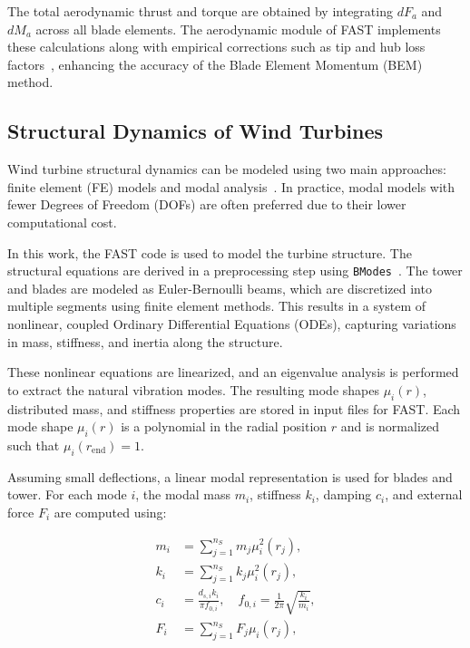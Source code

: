 The total aerodynamic thrust and torque are obtained by integrating $dF_a$ and $dM_a$ across all blade elements. The aerodynamic module of FAST implements these calculations along with empirical corrections such as tip and hub loss factors~\cite{fastV3}, enhancing the accuracy of the Blade Element Momentum (BEM) method.
         
\subsection{Structural Dynamics of Wind Turbines}

Wind turbine structural dynamics can be modeled using two main approaches: finite element (FE) models and modal analysis~\cite{bossanyi2010}. In practice, modal models with fewer Degrees of Freedom (DOFs) are often preferred due to their lower computational cost.

In this work, the FAST code is used to model the turbine structure. The structural equations are derived in a preprocessing step using \texttt{BModes}~\cite{bir2009}. The tower and blades are modeled as Euler-Bernoulli beams, which are discretized into multiple segments using finite element methods. This results in a system of nonlinear, coupled Ordinary Differential Equations (ODEs), capturing variations in mass, stiffness, and inertia along the structure.

These nonlinear equations are linearized, and an eigenvalue analysis is performed to extract the natural vibration modes. The resulting mode shapes $\mu_i(r)$, distributed mass, and stiffness properties are stored in input files for FAST. Each mode shape $\mu_i(r)$ is a polynomial in the radial position $r$ and is normalized such that $\mu_i(r_{\text{end}}) = 1$.

Assuming small deflections, a linear modal representation is used for blades and tower. For each mode $i$, the modal mass $m_i$, stiffness $k_i$, damping $c_i$, and external force $F_i$ are computed using:

\begin{align}
    m_i &= \sum_{j=1}^{n_S} m_j \mu_i^2(r_j), \label{eq:modal_mass} \\
    k_i &= \sum_{j=1}^{n_S} k_j \mu_i^2(r_j), \label{eq:modal_stiffness} \\
    c_i &= \frac{d_{s,i} k_i}{\pi f_{0,i}}, \quad f_{0,i} = \frac{1}{2\pi} \sqrt{\frac{k_i}{m_i}}, \label{eq:modal_damping} \\
    F_i &= \sum_{j=1}^{n_S} F_j \mu_i(r_j), \label{eq:modal_force}
\end{align}


